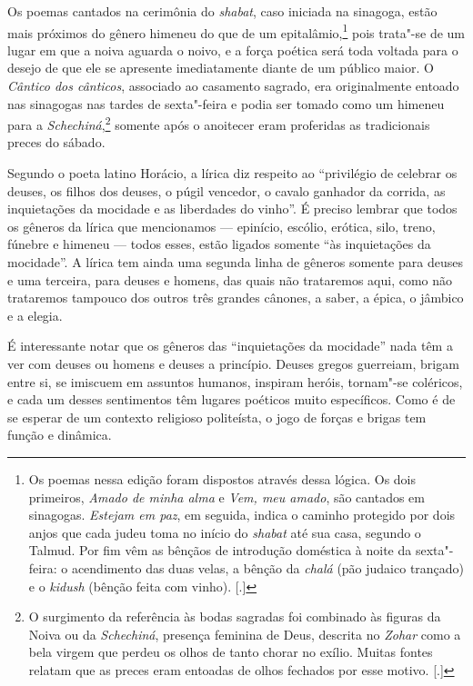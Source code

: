 Os poemas cantados na cerimônia do \emph{shabat}, caso iniciada na sinagoga,
estão mais próximos do gênero himeneu do que de um epitalâmio,\footnote{Os poemas nessa edição foram dispostos através dessa lógica. Os dois primeiros, \emph{Amado de minha alma} e \emph{Vem, meu amado}, são cantados em sinagogas. \emph{Estejam em paz}, em seguida, indica o caminho protegido por dois anjos que cada judeu toma no início do \emph{shabat} até sua casa, segundo o Talmud. Por fim vêm as bênçãos de introdução doméstica à noite da sexta"-feira: o acendimento das duas velas, a bênção da \emph{chalá} (pão judaico trançado) e o \emph{kidush} (bênção feita com vinho). [.]} pois
trata"-se de um lugar em que a noiva aguarda o noivo, e a força poética
será toda voltada para o desejo de que ele se apresente imediatamente
diante de um público maior. O \emph{Cântico dos cânticos}, associado ao
casamento sagrado, era originalmente entoado nas sinagogas nas tardes de
sexta"-feira e podia ser tomado como um himeneu para a \emph{Schechiná},\footnote{O surgimento da referência às bodas sagradas foi combinado às figuras da Noiva ou da \emph{Schechiná}, presença feminina de Deus, descrita no \emph{Zohar} como a bela virgem que perdeu os olhos de tanto chorar no exílio. Muitas fontes relatam que as preces eram entoadas de olhos fechados por esse motivo. [.]}
somente após o anoitecer eram proferidas as tradicionais preces do
sábado.

Segundo o poeta latino Horácio, a lírica diz respeito ao ``privilégio de
celebrar os deuses, os filhos dos deuses, o púgil vencedor, o cavalo
ganhador da corrida, as inquietações da mocidade e as liberdades
do vinho''. É preciso lembrar que todos os gêneros da lírica que
mencionamos --- epinício, escólio, erótica, silo, treno, fúnebre e
himeneu --- todos esses, estão ligados somente ``às inquietações da
mocidade''. A lírica tem ainda uma segunda linha de gêneros somente para
deuses e uma terceira, para deuses e homens, das quais não trataremos
aqui, como não trataremos tampouco dos outros três grandes cânones, a
saber, a épica, o jâmbico e a elegia.

É interessante notar que os gêneros das ``inquietações da mocidade'' nada
têm a ver com deuses ou homens e deuses a princípio. Deuses gregos
guerreiam, brigam entre si, se imiscuem em assuntos humanos, inspiram
heróis, tornam"-se coléricos, e cada um desses sentimentos têm lugares
poéticos muito específicos. Como é de se esperar de um contexto
religioso politeísta, o jogo de forças e brigas tem função e dinâmica.

